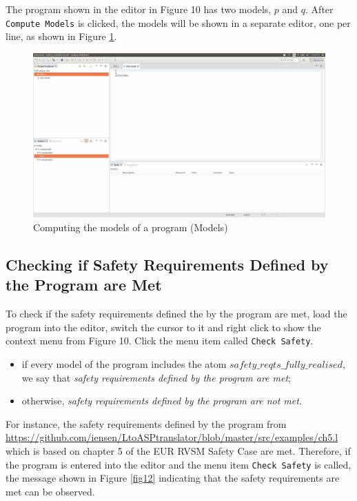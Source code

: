 \documentclass[a4paper,10pt]{article}
\begin{document}
The program shown in the editor in Figure 10 has two models, $p$ and $q$. After   \texttt{Compute Models} is clicked, the models will be shown in a separate editor, one per line, as shown in Figure \ref{fig11}.


\begin{figure}[H]
\centering
\includegraphics[width=1.0\textwidth]{11}
\caption{Computing the models of a program (Models)}\label{fig11}
\end{figure}



\subsection{Checking if Safety Requirements Defined by the Program are Met}  

To check if the safety requirements defined the by the program are met, load the program into the editor, switch the cursor to it and right click to show the context menu from Figure 10. Click  the menu item called \texttt{Check Safety}.
\begin{itemize}
\item if every model of the program includes the atom $safety\_reqts\_fully\_realised$, 
we say that \textit{safety requirements defined by the program are met};
\item otherwise, \textit{safety requirements defined by the program are not met.}
\end{itemize}

\noindent
For instance, the safety requirements defined by the program from \url{https://github.com/iensen/LtoASPtranslator/blob/master/src/examples/ch5.l}\\ which is based on chapter 5 of the EUR RVSM Safety Case \cite{?} are met. Therefore, if the program is entered into the editor and the menu item \texttt{Check Safety} is called, the  message shown in Figure \ref{fig12} indicating that the safety requirements are met can be observed.
\end{document}
